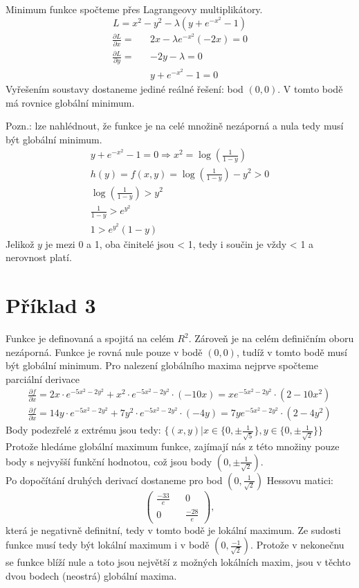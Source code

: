 \documentclass[11pt,a4paper]{article}
\begin{document}
Minimum funkce spočteme přes Lagrangeovy multiplikátory.
\begin{equation*}
L = x^2 - y^2 - \lambda(y+e^{-x^2}-1)
\end{equation*}
\begin{align*}
\frac{\partial L}{\partial x} = && 2x -\lambda e^{-x^2} (-2x) = 0 \\
\frac{\partial L}{\partial y} = && -2y - \lambda = 0 \\
&& y+e^{-x^2}-1 = 0
\end{align*}
Vyřešením soustavy dostaneme jediné reálné řešení: bod $(0,0)$. V tomto bodě má rovnice globální minimum.

Pozn.: lze nahlédnout, že funkce je na celé množině nezáporná a nula tedy musí být globální minimum.
\begin{align*}
y+e^{-x^2}-1 = 0 \Rightarrow x^2 = \log(\frac{1}{1-y}) \\
h(y) = f(x, y) = \log(\frac{1}{1-y}) - y^2 > 0 \\
\log(\frac{1}{1-y}) > y^2 \\
\frac{1}{1-y} > e^{y^2} \\
1 > e^{y^2}(1-y)
\end{align*}
Jelikož $y$ je mezi 0 a 1, oba činitelé jsou < 1, tedy i součin je vždy < 1 a nerovnost platí.

\section*{Příklad 3}
Funkce je definovaná a spojitá na celém $R^2$. Zároveň je na celém definičním oboru nezáporná. Funkce je rovná nule pouze v bodě $(0,0)$, tudíž v tomto bodě musí být globální minimum. Pro nalezení globálního maxima nejprve spočteme parciální derivace
\begin{align*}
\frac{\partial f}{\partial x} = 2x\cdot e^{-5x^2-2y^2} + x^2\cdot e^{-5x^2-2y^2}\cdot (-10x) = xe^{-5x^2-2y^2} \cdot (2-10x^2)\\
\frac{\partial f}{\partial x} = 14y\cdot e^{-5x^2-2y^2} + 7y^2 \cdot e^{-5x^2-2y^2} \cdot (-4y) = 7ye^{-5x^2-2y^2} \cdot (2-4y^2)
\end{align*}
Body podezřelé z extrému jsou tedy:
$\{(x,y) \vert x \in \{0,\pm\frac{1}{\sqrt{5}}\}, y \in \{0, \pm\frac{1}{\sqrt{2}}\} \}$
Protože hledáme globální maximum funkce, zajímají nás z této množiny pouze body s nejvyšší funkční hodnotou, což jsou body $(0, \pm\frac{1}{\sqrt{2}})$.\\
Po dopočítání druhých derivací dostaneme pro bod $(0,\frac{1}{\sqrt{2}})$ Hessovu matici:
$$
\left(
\begin{matrix}
\frac{-33}{e} && 0 \\
0 && \frac{-28}{e}
\end{matrix}
\right),
$$
která je negativně definitní, tedy v tomto bodě je lokální maximum. Ze sudosti funkce musí tedy být lokální maximum i v bodě $(0, \frac{-1}{\sqrt{2}})$. Protože v nekonečnu se funkce blíží nule a toto jsou největší z možných lokálních maxim, jsou v těchto dvou bodech (neostrá) globální maxima.
\end{document}

